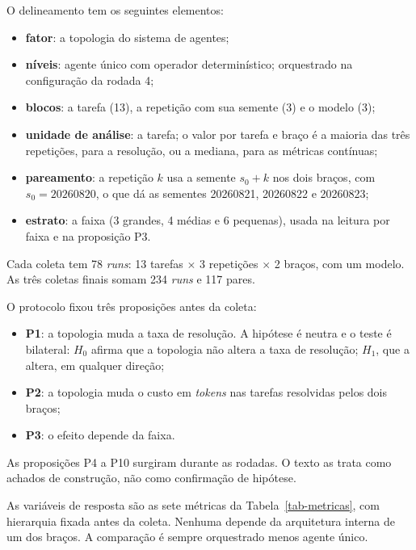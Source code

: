 O delineamento tem os seguintes elementos:

\begin{itemize}
    \item \textbf{fator}: a topologia do sistema de agentes;
    \item \textbf{níveis}: agente único com operador determinístico; orquestrado na configuração da rodada 4;
    \item \textbf{blocos}: a tarefa (13), a repetição com sua semente (3) e o modelo (3);
    \item \textbf{unidade de análise}: a tarefa; o valor por tarefa e braço é a maioria das três repetições, para a resolução, ou a mediana, para as métricas contínuas;
    \item \textbf{pareamento}: a repetição $k$ usa a semente $s_0 + k$ nos dois braços, com $s_0 = 20260820$, o que dá as sementes 20260821, 20260822 e 20260823;
    \item \textbf{estrato}: a faixa (3 grandes, 4 médias e 6 pequenas), usada na leitura por faixa e na proposição P3.
\end{itemize}

Cada coleta tem 78 \textit{runs}: 13 tarefas $\times$ 3 repetições $\times$ 2 braços, com um modelo. As três coletas finais somam 234 \textit{runs} e 117 pares.

O protocolo fixou três proposições antes da coleta:

\begin{itemize}
    \item \textbf{P1}: a topologia muda a taxa de resolução. A hipótese é neutra e o teste é bilateral: $H_0$ afirma que a topologia não altera a taxa de resolução; $H_1$, que a altera, em qualquer direção;
    \item \textbf{P2}: a topologia muda o custo em \textit{tokens} nas tarefas resolvidas pelos dois braços;
    \item \textbf{P3}: o efeito depende da faixa.
\end{itemize}

As proposições P4 a P10 surgiram durante as rodadas. O texto as trata como achados de construção, não como confirmação de hipótese.

As variáveis de resposta são as sete métricas da Tabela~\ref{tab-metricas}, com hierarquia fixada antes da coleta. Nenhuma depende da arquitetura interna de um dos braços. A comparação é sempre orquestrado menos agente único.

